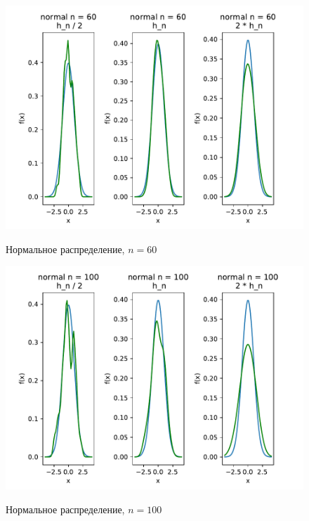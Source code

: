 \documentclass[a4paper]{article}
\begin{document}
\begin{figure}[H]
	\centering
	{\includegraphics[scale=0.5]{src_lab_4/kde_60_normal}}
		\caption{Нормальное распределение, $n=60$}
		\label{fig:kde_normal_60}
	\end{figure}

\begin{figure}[H]
	\centering
	{\includegraphics[scale=0.5]{src_lab_4/kde_100_normal}}
		\caption{Нормальное распределение, $n=100$}
		\label{fig:kde_normal_100}
	\end{figure}
\end{document}
